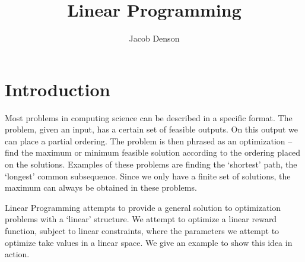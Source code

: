 

\title{Linear Programming}
\author{Jacob Denson}


    \maketitle
    \tableofcontents

    \chapter{Introduction}

    Most problems in computing science can be described in a specific format. The problem, given an input, has a certain set of feasible outputs. On this output we can place a partial ordering. The problem is then phrased as an optimization -- find the maximum or minimum feasible solution according to the ordering placed on the solutions. Examples of these problems are finding the `shortest' path, the `longest' common subsequence. Since we only have a finite set of solutions, the maximum can always be obtained in these problems.

    Linear Programming attempts to provide a general solution to optimization problems with a `linear' structure. We attempt to optimize a linear reward function, subject to linear constraints, where the parameters we attempt to optimize take values in a linear space. We give an example to show this idea in action.


